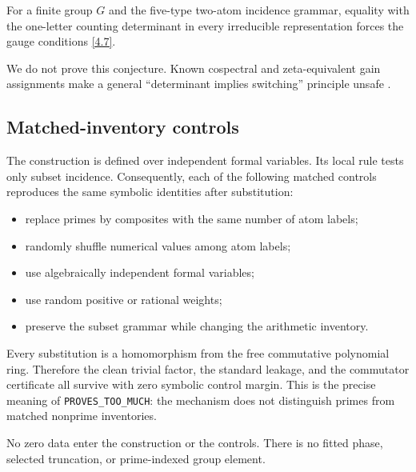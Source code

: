\begin{conjecture}
For a finite group $G$ and the five-type two-atom incidence grammar, equality
with the one-letter counting determinant in every irreducible representation
forces the gauge conditions \eqref{4.7}.
\end{conjecture}

We do not prove this conjecture.  Known cospectral and zeta-equivalent gain
assignments make a general “determinant implies switching” principle unsafe
\citep{CavaleriDonno2022Cospectral,AbiadBelardoKhramova2024Gain,CavaleriDonnoSpessato2025Gain}.

\subsection{Matched-inventory controls}

The construction is defined over independent formal variables.  Its local
rule tests only subset incidence.  Consequently, each of the following
matched controls reproduces the same symbolic identities after substitution:

\begin{itemize}
\item replace primes by composites with the same number of atom labels;
\item randomly shuffle numerical values among atom labels;
\item use algebraically independent formal variables;
\item use random positive or rational weights;
\item preserve the subset grammar while changing the arithmetic inventory.
\end{itemize}

Every substitution is a homomorphism from the free commutative polynomial
ring.  Therefore the clean trivial factor, the standard leakage, and the
commutator certificate all survive with zero symbolic control margin.  This
is the precise meaning of \texttt{PROVES\_TOO\_MUCH}: the mechanism does not
distinguish primes from matched nonprime inventories.

No zero data enter the construction or the controls.  There is no fitted
phase, selected truncation, or prime-indexed group element.
